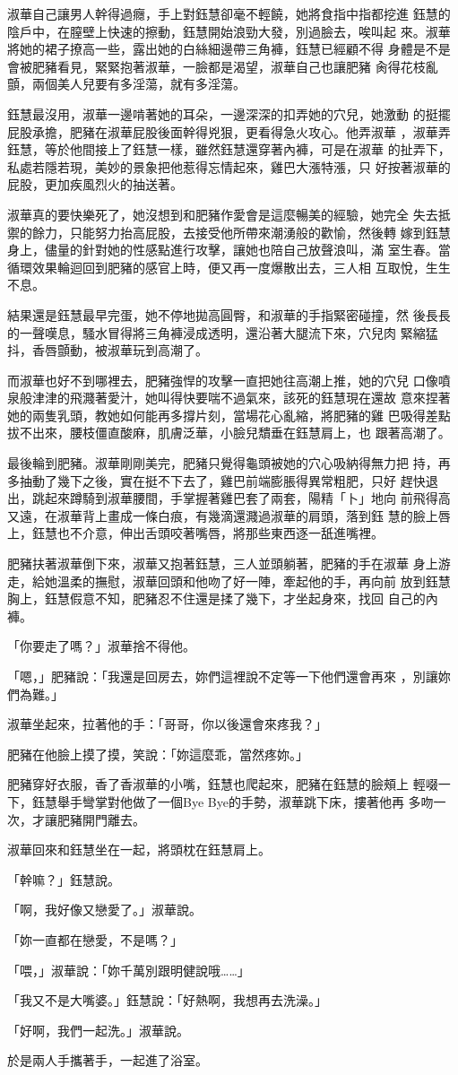 淑華自己讓男人幹得過癮，手上對鈺慧卻毫不輕饒，她將食指中指都挖進
鈺慧的陰戶中，在膣壁上快速的擦動，鈺慧開始浪勁大發，別過臉去，唉叫起
來。淑華將她的裙子撩高一些，露出她的白絲細邊帶三角褲，鈺慧已經顧不得
身體是不是會被肥豬看見，緊緊抱著淑華，一臉都是渴望，淑華自己也讓肥豬
肏得花枝亂顫，兩個美人兒要有多淫蕩，就有多淫蕩。

鈺慧最沒用，淑華一邊啃著她的耳朵，一邊深深的扣弄她的穴兒，她激動
的挺擺屁股承擔，肥豬在淑華屁股後面幹得兇狠，更看得急火攻心。他弄淑華
，淑華弄鈺慧，等於他間接上了鈺慧一樣，雖然鈺慧還穿著內褲，可是在淑華
的扯弄下，私處若隱若現，美妙的景象把他惹得忘情起來，雞巴大漲特漲，只
好按著淑華的屁股，更加疾風烈火的抽送著。

淑華真的要快樂死了，她沒想到和肥豬作愛會是這麼暢美的經驗，她完全
失去抵禦的餘力，只能努力抬高屁股，去接受他所帶來潮湧般的歡愉，然後轉
嫁到鈺慧身上，儘量的針對她的性感點進行攻擊，讓她也陪自己放聲浪叫，滿
室生春。當循環效果輪迴回到肥豬的感官上時，便又再一度爆散出去，三人相
互取悅，生生不息。

結果還是鈺慧最早完蛋，她不停地拋高圓臀，和淑華的手指緊密碰撞，然
後長長的一聲嘆息，騷水冒得將三角褲浸成透明，還沿著大腿流下來，穴兒肉
緊縮猛抖，香唇顫動，被淑華玩到高潮了。

而淑華也好不到哪裡去，肥豬強悍的攻擊一直把她往高潮上推，她的穴兒
口像噴泉般津津的飛濺著愛汁，她叫得快要喘不過氣來，該死的鈺慧現在還故
意來捏著她的兩隻乳頭，教她如何能再多撐片刻，當場花心亂縮，將肥豬的雞
巴吸得差點拔不出來，腰枝僵直酸麻，肌膚泛華，小臉兒穨垂在鈺慧肩上，也
跟著高潮了。

最後輪到肥豬。淑華剛剛美完，肥豬只覺得龜頭被她的穴心吸納得無力把
持，再多抽動了幾下之後，實在挺不下去了，雞巴前端膨脹得異常粗肥，只好
趕快退出，跳起來蹲騎到淑華腰間，手掌握著雞巴套了兩套，陽精「卜」地向
前飛得高又遠，在淑華背上畫成一條白痕，有幾滴還濺過淑華的肩頭，落到鈺
慧的臉上唇上，鈺慧也不介意，伸出舌頭咬著嘴唇，將那些東西逐一舐進嘴裡。

肥豬扶著淑華倒下來，淑華又抱著鈺慧，三人並頭躺著，肥豬的手在淑華
身上游走，給她溫柔的撫慰，淑華回頭和他吻了好一陣，牽起他的手，再向前
放到鈺慧胸上，鈺慧假意不知，肥豬忍不住還是揉了幾下，才坐起身來，找回
自己的內褲。

「你要走了嗎？」淑華捨不得他。

「嗯，」肥豬說：「我還是回房去，妳們這裡說不定等一下他們還會再來
，別讓妳們為難。」

淑華坐起來，拉著他的手：「哥哥，你以後還會來疼我？」

肥豬在他臉上摸了摸，笑說：「妳這麼乖，當然疼妳。」

肥豬穿好衣服，香了香淑華的小嘴，鈺慧也爬起來，肥豬在鈺慧的臉頰上
輕啜一下，鈺慧舉手彎掌對他做了一個Bye Bye的手勢，淑華跳下床，摟著他再
多吻一次，才讓肥豬開門離去。

淑華回來和鈺慧坐在一起，將頭枕在鈺慧肩上。

「幹嘛？」鈺慧說。

「啊，我好像又戀愛了。」淑華說。

「妳一直都在戀愛，不是嗎？」

「喂，」淑華說：「妳千萬別跟明健說哦……」

「我又不是大嘴婆。」鈺慧說：「好熱啊，我想再去洗澡。」

「好啊，我們一起洗。」淑華說。

於是兩人手攜著手，一起進了浴室。











